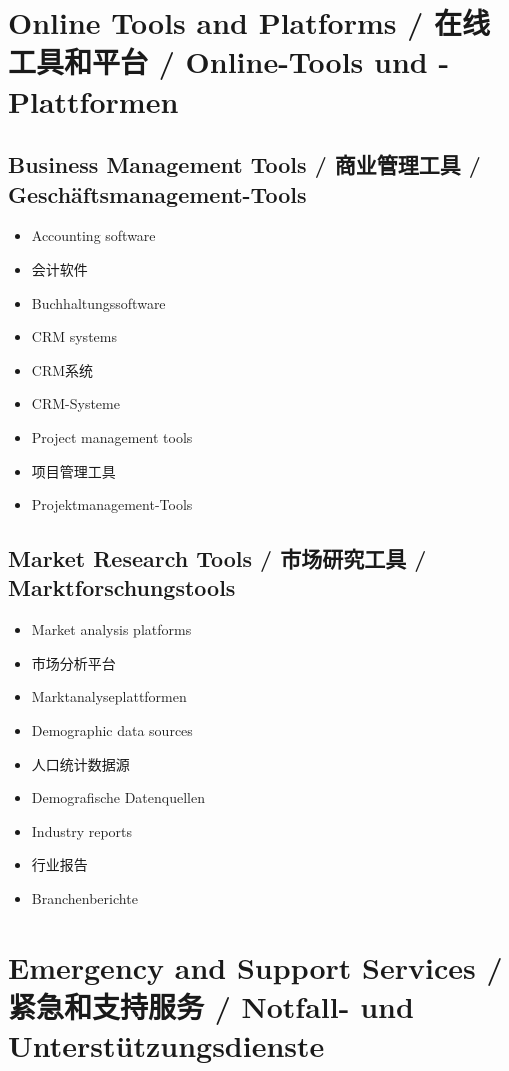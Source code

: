 \section{Online Tools and Platforms / 在线工具和平台 / Online-Tools und -Plattformen}

\subsection{Business Management Tools / 商业管理工具 / Geschäftsmanagement-Tools}
\begin{itemize}
    \item Accounting software
    \item 会计软件
    \item Buchhaltungssoftware
    \item CRM systems
    \item CRM系统
    \item CRM-Systeme
    \item Project management tools
    \item 项目管理工具
    \item Projektmanagement-Tools
\end{itemize}

\subsection{Market Research Tools / 市场研究工具 / Marktforschungstools}
\begin{itemize}
    \item Market analysis platforms
    \item 市场分析平台
    \item Marktanalyseplattformen
    \item Demographic data sources
    \item 人口统计数据源
    \item Demografische Datenquellen
    \item Industry reports
    \item 行业报告
    \item Branchenberichte
\end{itemize}

\section{Emergency and Support Services / 紧急和支持服务 / Notfall- und Unterstützungsdienste}


